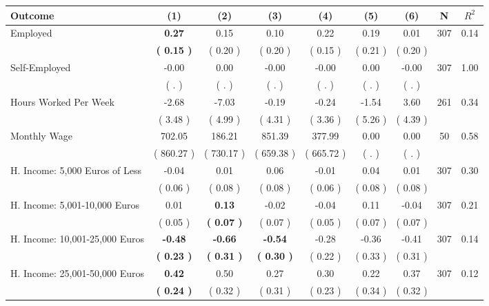 \begin{tabular}{lcccccccc}
\toprule
 \textbf{Outcome} & \textbf{(1)} & \textbf{(2)} & \textbf{(3)} & \textbf{(4)} & \textbf{(5)} & \textbf{(6)} & \textbf{N} & \textbf{$ R^2$} \\
\midrule
Employed & \textbf{     0.27} &      0.15 &      0.10 &      0.22 &      0.19 &      0.01 & 307 &       0.14 \\ 
 & \textbf{(     0.15 )} & (     0.20 ) & (     0.20 ) & (     0.15 ) & (     0.21 ) & (     0.20 ) & \\
Self-Employed &     -0.00 &      0.00 &     -0.00 &     -0.00 &      0.00 &     -0.00 & 307 &       1.00 \\ 
 & (        . ) & (        . ) & (        . ) & (        . ) & (        . ) & (        . ) & \\
Hours Worked Per Week &     -2.68 &     -7.03 &     -0.19 &     -0.24 &     -1.54 &      3.60 & 261 &       0.34 \\ 
 & (     3.48 ) & (     4.99 ) & (     4.31 ) & (     3.36 ) & (     5.26 ) & (     4.39 ) & \\
Monthly Wage &    702.05 &    186.21 &    851.39 &    377.99 &      0.00 &      0.00 & 50 &       0.58 \\ 
 & (   860.27 ) & (   730.17 ) & (   659.38 ) & (   665.72 ) & (        . ) & (        . ) & \\
H. Income: 5,000 Euros of Less &     -0.04 &      0.01 &      0.06 &     -0.01 &      0.04 &      0.01 & 307 &       0.30 \\ 
 & (     0.06 ) & (     0.08 ) & (     0.08 ) & (     0.06 ) & (     0.08 ) & (     0.08 ) & \\
H. Income: 5,001-10,000 Euros &      0.01 & \textbf{     0.13} &     -0.02 &     -0.04 &      0.11 &     -0.04 & 307 &       0.21 \\ 
 & (     0.05 ) & \textbf{(     0.07 )} & (     0.07 ) & (     0.05 ) & (     0.07 ) & (     0.07 ) & \\
H. Income: 10,001-25,000 Euros & \textbf{    -0.48} & \textbf{    -0.66} & \textbf{    -0.54} &     -0.28 &     -0.36 &     -0.41 & 307 &       0.14 \\ 
 & \textbf{(     0.23 )} & \textbf{(     0.31 )} & \textbf{(     0.30 )} & (     0.22 ) & (     0.33 ) & (     0.31 ) & \\
H. Income: 25,001-50,000 Euros & \textbf{     0.42} &      0.50 &      0.27 &      0.30 &      0.22 &      0.37 & 307 &       0.12 \\ 
 & \textbf{(     0.24 )} & (     0.32 ) & (     0.31 ) & (     0.23 ) & (     0.34 ) & (     0.32 ) & \\

\end{tabular}
